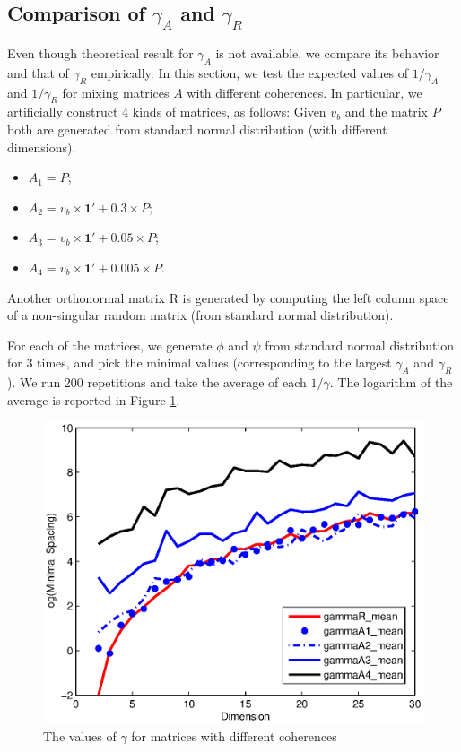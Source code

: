 \documentclass[twoside]{article}
\theoremstyle{definition}
\begin{document}
\subsection{Comparison of $\gamma_A$ and $\gamma_R$}
\label{subsec:comparisonGamma}
Even though theoretical result for $\gamma_A$ is not available, we compare its behavior and that of $\gamma_R$ empirically. 
In this section, we test the expected values of $1/\gamma_A$ and $1/\gamma_R$ for mixing matrices $A$ with different coherences.
In particular, we artificially construct 4 kinds of matrices, as follows:
Given $v_b$ and the matrix $P$ both are generated from standard normal distribution (with different dimensions).
\begin{itemize}
\vspace{-3mm}
\item $A_1 = P$;
\item $A_2 = v_b\times\boldsymbol{1}' + 0.3\times P$;
\item $A_3 = v_b\times\boldsymbol{1}' + 0.05\times P$;
\item $A_4 = v_b\times\boldsymbol{1}' + 0.005\times P$.
\end{itemize}
\vspace{-2mm}
Another orthonormal matrix R is generated by computing the left column space of a non-singular random matrix (from standard normal distribution).  

For each of the matrices, we generate $\phi$ and $\psi$ from standard normal distribution for 3 times, and pick the minimal values (corresponding to the largest $\gamma_A$ and $\gamma_R$).
We run 200 repetitions and take the average of each $1/\gamma$. The logarithm of the average is reported in Figure \ref{fig:miniSpacing}.
\begin{figure}[h]
\label{fig:miniSpacing}
\centering
	\includegraphics[width = \columnwidth]{miniSpacing}
\caption{The values of $\gamma$ for matrices with different coherences}
\end{figure}
\end{document}
